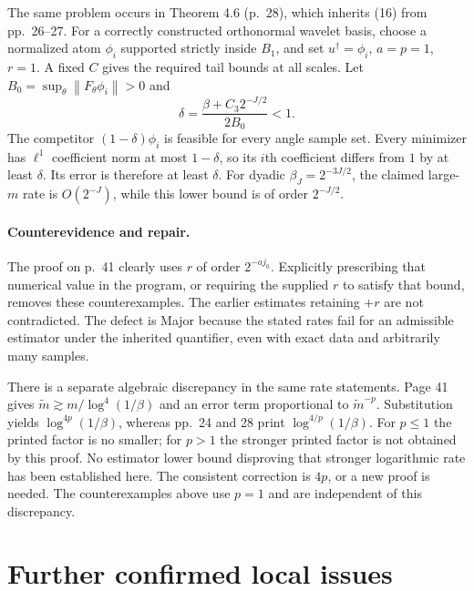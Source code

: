 \documentclass[10pt]{article}
\begin{document}
The same problem occurs in Theorem 4.6 (p. 28), which inherits (16) from pp. 26–27. For a correctly constructed orthonormal wavelet basis, choose a normalized atom \(\phi_i\) supported strictly inside \(B_1\), and set \(u^\dagger=\phi_i\), \(a=p=1\), \(r=1\). A fixed \(C\) gives the required tail bounds at all scales. Let \(B_0=\sup_\theta\left\lVert F_\theta\phi_i\right\rVert>0\) and \[\delta=\frac{\beta+C_3 2^{-J/2}}{2B_0}<1.\] The competitor \((1-\delta)\phi_i\) is feasible for every angle sample set. Every minimizer has \(\ell^1\) coefficient norm at most \(1-\delta\), so its \(i\)th coefficient differs from \(1\) by at least \(\delta\). Its error is therefore at least \(\delta\). For dyadic \(\beta_J=2^{-3J/2}\), the claimed large-\(m\) rate is \(O(2^{-J})\), while this lower bound is of order \(2^{-J/2}\).\par
\paragraph*{Counterevidence and repair.}\mbox{}\par
The proof on p. 41 clearly uses \(r\) of order \(2^{-aj_0}\). Explicitly prescribing that numerical value in the program, or requiring the supplied \(r\) to satisfy that bound, removes these counterexamples. The earlier estimates retaining \(+r\) are not contradicted. The defect is Major because the stated rates fail for an admissible estimator under the inherited quantifier, even with exact data and arbitrarily many samples.\par
There is a separate algebraic discrepancy in the same rate statements. Page 41 gives \(\widetilde m\gtrsim m/\log^4(1/\beta)\) and an error term proportional to \(\widetilde m^{-p}\). Substitution yields \(\log^{4p}(1/\beta)\), whereas pp. 24 and 28 print \(\log^{4/p}(1/\beta)\). For \(p\le1\) the printed factor is no smaller; for \(p>1\) the stronger printed factor is not obtained by this proof. No estimator lower bound disproving that stronger logarithmic rate has been established here. The consistent correction is \(4p\), or a new proof is needed. The counterexamples above use \(p=1\) and are independent of this discrepancy.\par
\section*{Further confirmed local issues}
\end{document}
